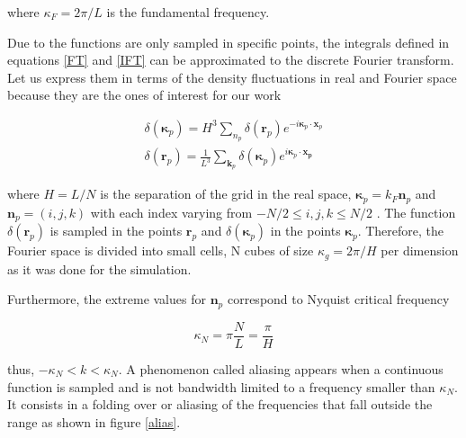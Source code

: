 where $\kappa_F=2\pi/L$ is the fundamental frequency.

Due to the functions are only sampled in specific points, the integrals defined in 
equations \ref{FT} and \ref{IFT} can be approximated to the discrete Fourier transform. 
Let us express them in terms of the density fluctuations in real and Fourier space 
because they are the ones of interest for our work 

\begin{eqnarray*}
\delta(\boldsymbol{\kappa}_p) = H^3 \sum_{n_p} \delta(\boldsymbol{r}_p) e^{-i\boldsymbol{\kappa}_p\cdot \boldsymbol{x}_p} \\
\delta(\boldsymbol{r}_p) = \frac{1}{L^3}\sum_{\boldsymbol{k}_p} \delta(\boldsymbol{\kappa}_p) e^{i\boldsymbol{\kappa}_p\cdot \boldsymbol{x_p}} 
\end{eqnarray*} 

where $H = L/N$ is the separation of the grid in the real space, 
$\boldsymbol{\kappa}_p = k_F \textbf{n}_p$ and $ \boldsymbol{n}_p = (i,j,k)$ with each index
varying from $-N/2 \leq i,j,k \leq N/2$ . The function $\delta(\boldsymbol{r}_p)$  is sampled 
in the points $\boldsymbol{r}_p$ and $\delta(\boldsymbol{\kappa}_p)$ in the points 
$\boldsymbol{\kappa}_p$. Therefore, the Fourier space is divided into small cells, N cubes of size 
$\kappa_g = 2\pi/H$ per dimension as it was done for the simulation. 

Furthermore, the extreme values for $\boldsymbol{n}_p$ correspond to Nyquist critical 
frequency 

\[\kappa_N = \pi\frac{N}{L} = \frac{\pi}{H} \]

thus, $-\kappa_N < k < \kappa_N $. A phenomenon called aliasing appears when a continuous 
function is sampled and is not bandwidth limited to a frequency smaller than $\kappa_N$. 
It consists in a folding over or aliasing of the frequencies that fall outside the range
as shown in figure \ref{alias}. 

